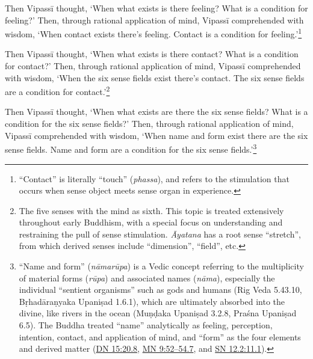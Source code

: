 \documentclass[12pt,openany]{book}%
\begin{document}
Then \textsanskrit{Vipassī} thought, ‘When what exists is there feeling? What is a condition for feeling?’ Then, through rational application of mind, \textsanskrit{Vipassī} comprehended with wisdom, ‘When contact exists there’s feeling. Contact is a condition for feeling.’\footnote{“Contact” is literally “touch” (\textit{phassa}), and refers to the stimulation that occurs when sense object meets sense organ in experience. } 

Then \textsanskrit{Vipassī} thought, ‘When what exists is there contact? What is a condition for contact?’ Then, through rational application of mind, \textsanskrit{Vipassī} comprehended with wisdom, ‘When the six sense fields exist there’s contact. The six sense fields are a condition for contact.’\footnote{The five senses with the mind as sixth. This topic is treated extensively throughout early Buddhism, with a special focus on understanding and restraining the pull of sense stimulation. \textit{Āyatana} has a root sense “stretch”, from which derived senses include “dimension”, “field”, etc. } 

Then \textsanskrit{Vipassī} thought, ‘When what exists are there the six sense fields? What is a condition for the six sense fields?’ Then, through rational application of mind, \textsanskrit{Vipassī} comprehended with wisdom, ‘When name and form exist there are the six sense fields. Name and form are a condition for the six sense fields.’\footnote{“Name and form” (\textit{\textsanskrit{nāmarūpa}}) is a Vedic concept referring to the multiplicity of material forms (\textit{\textsanskrit{rūpa}}) and associated names (\textit{\textsanskrit{nāma}}), especially the individual “sentient organisms” such as gods and humans (Rig Veda 5.43.10, \textsanskrit{Bṛhadāraṇyaka} \textsanskrit{Upaniṣad} 1.6.1), which are ultimately absorbed into the divine, like rivers in the ocean (\textsanskrit{Muṇḍaka} \textsanskrit{Upaniṣad} 3.2.8, \textsanskrit{Praśna} \textsanskrit{Upaniṣad} 6.5). The Buddha treated “name” analytically as feeling, perception, intention, contact, and application of mind, and “form” as the four elements and derived matter (\href{https://suttacentral.net/dn15/en/sujato\#20.8}{DN 15:20.8}, \href{https://suttacentral.net/mn9/en/sujato\#52-54.7}{MN 9:52–54.7}, and \href{https://suttacentral.net/sn12.2/en/sujato\#11.1}{SN 12.2:11.1}). } 
\end{document}
